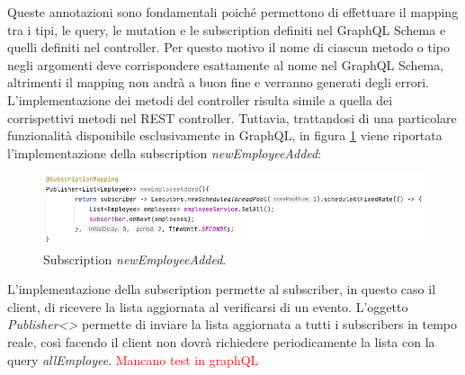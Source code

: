 Queste annotazioni sono fondamentali poiché permettono di effettuare il mapping tra i tipi, le query, le mutation e le subscription definiti nel GraphQL Schema e quelli definiti nel controller. Per questo motivo il nome di ciascun metodo o tipo negli argomenti deve corrispondere esattamente al nome nel GraphQL Schema, altrimenti il mapping non andrà a buon fine e verranno generati degli errori.\\
L'implementazione dei metodi del controller risulta simile a quella dei corrispettivi metodi nel REST controller. Tuttavia, trattandosi di una particolare funzionalità disponibile esclusivamente in GraphQL, in figura \ref{subscription-graphql} viene riportata l'implementazione della subscription \textit{newEmployeeAdded}:
\FloatBarrier
\begin{figure}[!ht]
\centering
\includegraphics[width=1\linewidth]{immagini/newEmployeeAdded.png}
\caption{Subscription \textit{newEmployeeAdded}.}
\label{subscription-graphql}
\end{figure}
\FloatBarrier
L'implementazione della subscription permette al subscriber, in questo caso il client, di ricevere la lista aggiornata al verificarsi di un evento. L'oggetto \textit{Publisher<>} permette di inviare la lista aggiornata a tutti i subscribers in tempo reale, così facendo il client non dovrà richiedere periodicamente la lista con la query \textit{allEmployee}.
\textcolor{red}{Mancano test in graphQL}
